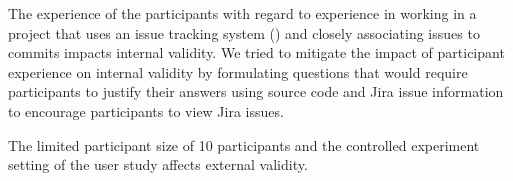 The experience of the participants with regard to experience in working in a project that uses an issue tracking system () and closely associating issues to commits impacts internal validity.
We tried to mitigate the impact of participant experience on internal validity by formulating questions that would require participants to justify their answers using source code and Jira issue information to
encourage participants to view Jira issues.

The limited participant size of 10 participants and the controlled experiment setting of the user study affects external validity.

\endinput

Any text after an \endinput is ignored.
You could put scraps here or things in progress.